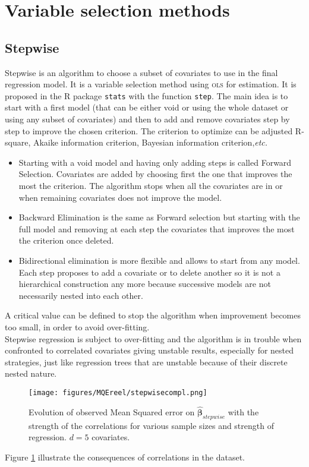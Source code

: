 \documentclass[12pt,a4paper]{report}
\begin{document}
		 \FloatBarrier
	\section{Variable selection methods}
		\subsection{Stepwise}
			
			Stepwise \cite{seber2012linear} is an algorithm to choose a subset of covariates to use in the final regression model. It is a variable selection method using \textsc{ols} for estimation. It is proposed in the R package {\tt stats} with the function {\tt step}. The main idea is to start with a first model (that can be either void or using the whole dataset or using any subset of covariates) and then to add and remove covariates step by step to improve the chosen criterion. The criterion to optimize can be adjusted R-square, Akaike information criterion, Bayesian information criterion,{\it etc.}  \\
			\begin{itemize}
				\item 	Starting with a void model and having only adding steps is called Forward Selection. Covariates are added by choosing first the one that improves the most the criterion. The algorithm stops when all the covariates are in or when remaining covariates does not improve the model.
				\item Backward Elimination is the same as Forward selection but starting with the full model and removing at each step the covariates that improves the most the criterion once deleted.
				\item Bidirectional elimination is more flexible and allows to start from any model. Each step proposes to add a covariate or to delete another so it is not a hierarchical construction any more because successive models are not necessarily nested into each other.
			\end{itemize}
		A critical value can be defined to stop the algorithm when improvement becomes too small, in order to avoid over-fitting. \\
		
		Stepwise regression is subject to over-fitting and the algorithm is in trouble when confronted to correlated covariates \cite{miller2002subset} giving unstable results, especially for nested strategies, just like regression trees that are unstable because of their discrete nested nature.
\begin{figure}
	 \centering
	  \texttt{[image: figures/MQEreel/stepwisecompl.png]}
	  \caption{Evolution of observed Mean Squared error on $\hat{\boldsymbol{\beta}}_{stepwise}$ with the strength of the correlations for various sample sizes and strength of regression. $d=5$ covariates. } \label{MQEstepwisecompl}
	\end{figure}
	Figure \ref{MQEstepwisecompl} illustrate the consequences of correlations in the dataset.
\end{document}
